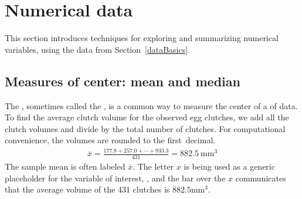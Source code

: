 \section[Numerical data]{Numerical data}
\label{numericalData}


This section introduces techniques for exploring and summarizing numerical variables, using the  data from Section~\ref{dataBasics}.

\subsection{Measures of center: mean and median}
\label{measuresOfCenter}

The , sometimes called the , is a common way to measure the center of a  of data. To find the average clutch volume for the observed egg clutches, we add all the clutch volumes and divide by the total number of clutches. For computational convenience, the volumes are rounded to the first~decimal.
\begin{eqnarray}
\overline{x} = \frac{177.8 + 257.0 + \cdots + 933.3}{431} = 882.5\ \textrm{mm}^{3}
\label{sampleMeanEquation}
\end{eqnarray}
The sample mean is often labeled $\overline{x}$. The letter $x$ is being used as a generic placeholder for the variable of interest, , and the bar over the $x$ communicates that the average volume of the 431 clutches is $882.5\textrm{mm}^{3}$. 


